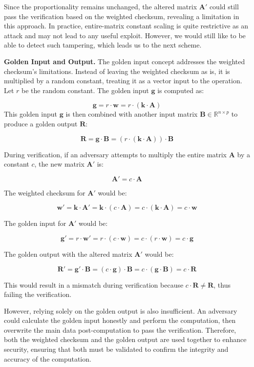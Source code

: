 Since the proportionality remains unchanged, the altered matrix \( \mathbf{A}' \) could still pass the verification based on the weighted checksum, revealing a limitation in this approach. In practice, entire-matrix constant scaling is quite restrictive as an attack and may not lead to any useful exploit. However, we would still like to be able to detect such tampering, which leads us to the next scheme. 

\noindent\textbf{Golden Input and Output.} The golden input concept addresses the weighted checksum's limitations. Instead of leaving the weighted checksum as is, it is multiplied by a random constant, treating it as a vector input to the operation. Let \( r \) be the random constant. The golden input \( \mathbf{g} \) is computed as:

\[
\mathbf{g} = r \cdot \mathbf{w} = r \cdot (\mathbf{k} \cdot \mathbf{A})
\]
This golden input \( \mathbf{g} \) is then combined with another input matrix \( \mathbf{B} \in \mathbb{R}^{n \times p} \) to produce a golden output \( \mathbf{R} \):

\[
\mathbf{R} = \mathbf{g} \cdot \mathbf{B} = (r \cdot (\mathbf{k} \cdot \mathbf{A})) \cdot \mathbf{B}
\]

During verification, if an adversary attempts to multiply the entire matrix \( \mathbf{A} \) by a constant \( c \), the new matrix \( \mathbf{A}' \) is:

\[
\mathbf{A}' = c \cdot \mathbf{A}
\]

The weighted checksum for \( \mathbf{A}' \) would be:

\[
\mathbf{w}' = \mathbf{k} \cdot \mathbf{A}' = \mathbf{k} \cdot (c \cdot \mathbf{A}) = c \cdot (\mathbf{k} \cdot \mathbf{A}) = c \cdot \mathbf{w}
\]

The golden input for \( \mathbf{A}' \) would be:

\[
\mathbf{g}' = r \cdot \mathbf{w}' = r \cdot (c \cdot \mathbf{w}) = c \cdot (r \cdot \mathbf{w}) = c \cdot \mathbf{g}
\]

The golden output with the altered matrix \( \mathbf{A}' \) would be:

\[
\mathbf{R}' = \mathbf{g}' \cdot \mathbf{B} = (c \cdot \mathbf{g}) \cdot \mathbf{B} = c \cdot (\mathbf{g} \cdot \mathbf{B}) = c \cdot \mathbf{R}
\]

This would result in a mismatch during verification because \( c \cdot \mathbf{R} \neq \mathbf{R} \), thus failing the verification.

However, relying solely on the golden output is also insufficient. An adversary could calculate the golden input honestly and perform the computation, then overwrite the main data post-computation to pass the verification. Therefore, both the weighted checksum and the golden output are used together to enhance security, ensuring that both must be validated to confirm the integrity and accuracy of the computation.


